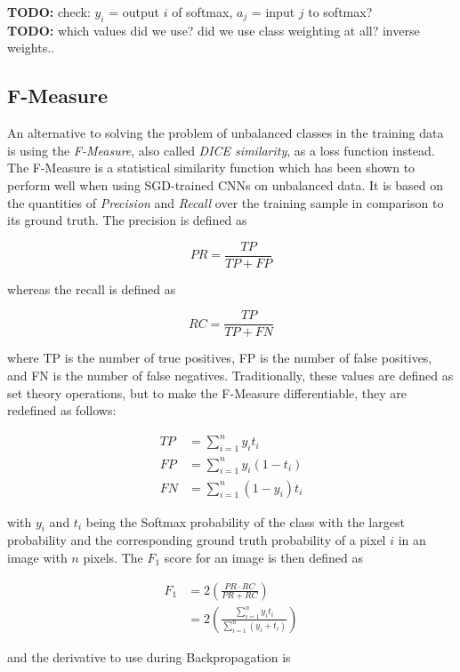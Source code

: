 \textbf{TODO:} check: $y_i$ = output $i$ of softmax, $a_j$ = input $j$ to softmax?\\
 \textbf{TODO:} which values did we use? did we use class weighting at all? inverse weights..


		\subsection{F-Measure}

An alternative to solving the problem of unbalanced classes in the training data is using the \textit{F-Measure}, also called \textit{DICE similarity}, as a loss function instead. The F-Measure is a statistical similarity function which has been shown to perform well when using SGD-trained CNNs on unbalanced data. \cite{fmeasure3}\cite{fmeasure4}\cite{fmeasure5} It is based on the quantities of \textit{Precision} and \textit{Recall} over the training sample in comparison to its ground truth. The precision is defined as

\[ PR = \frac{TP}{TP + FP} \]

\noindent whereas the recall is defined as

\[ RC = \frac{TP}{TP + FN} \]

\noindent where TP is the number of true positives, FP is the number of false positives, and FN is the number of false negatives. Traditionally, these values are defined as set theory operations, but to make the F-Measure differentiable, they are redefined as follows:

\begin {align}
TP &= \sum \limits_{i=1}^{n} y_i t_i \\
FP &= \sum  \limits_{i=1}^{n} y_i (1 - t_i) \\
FN &= \sum \limits_{i=1}^{n} (1 - y_i) t_i
\end {align}

\noindent with $y_i$ and $t_i$ being the Softmax probability of the class with the largest probability and the corresponding ground truth probability of a pixel $i$ in an image with $n$ pixels. The $F_1$ score for an image is then defined as

\begin {align}
 	F_1 &= 2 \left ( \frac{PR \cdot RC}{PR + RC} \right ) \\
		&= 2 \left ( \frac{\sum_{i=1}^{n} y_i t_i }{ \sum_{i=1}^{n} (y_i + t_i) } \right )
\end {align}

\noindent and the derivative to use during Backpropagation is

